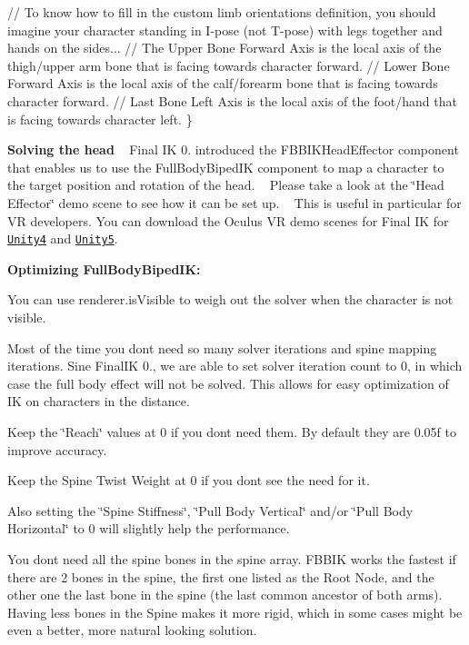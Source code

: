 \begin{DoxyCode}
    \textcolor{comment}{// To know how to fill in the custom limb orientations definition, you should imagine your character
       standing in I-pose (not T-pose) with legs together and hands on the sides...}
    \textcolor{comment}{// The Upper Bone Forward Axis is the local axis of the thigh/upper arm bone that is facing towards
       character forward.}
    \textcolor{comment}{// Lower Bone Forward Axis is the local axis of the calf/forearm bone that is facing towards character
       forward.}
    \textcolor{comment}{// Last Bone Left Axis is the local axis of the foot/hand that is facing towards character left.}
\}
\end{DoxyCode}


{\bfseries Solving the head} ~\newline
 Final IK 0. introduced the F\+B\+B\+I\+K\+Head\+Effector component that enables us to use the Full\+Body\+Biped\+IK component to map a character to the target position and rotation of the head. ~\newline
Please take a look at the \char`\"{}\+Head Effector\char`\"{} demo scene to see how it can be set up. ~\newline
This is useful in particular for VR developers. You can download the Oculus VR demo scenes for Final IK for \href{http://www.root-motion.com/addons/FinalIK_OVR.unitypackage}{\tt Unity4} and \href{http://www.root-motion.com/addons/FinalIK_OVR_Unity5.unitypackage}{\tt Unity5}.

{\bfseries Optimizing Full\+Body\+Biped\+IK\+:}
\begin{DoxyItemize}
\item You can use renderer.\+is\+Visible to weigh out the solver when the character is not visible.
\item Most of the time you don\textquotesingle{}t need so many solver iterations and spine mapping iterations. Sine Final\+IK 0., we are able to set solver iteration count to 0, in which case the full body effect will not be solved. This allows for easy optimization of IK on characters in the distance.
\item Keep the \char`\"{}\+Reach\char`\"{} values at 0 if you don\textquotesingle{}t need them. By default they are 0.\+05f to improve accuracy.
\item Keep the Spine Twist Weight at 0 if you don\textquotesingle{}t see the need for it.
\item Also setting the \char`\"{}\+Spine Stiffness\char`\"{}, \char`\"{}\+Pull Body Vertical\char`\"{} and/or \char`\"{}\+Pull Body Horizontal\char`\"{} to 0 will slightly help the performance.
\item You don\textquotesingle{}t need all the spine bones in the spine array. F\+B\+B\+IK works the fastest if there are 2 bones in the spine, the first one listed as the Root Node, and the other one the last bone in the spine (the last common ancestor of both arms). Having less bones in the Spine makes it more rigid, which in some cases might be even a better, more natural looking solution.
\end{DoxyItemize}

